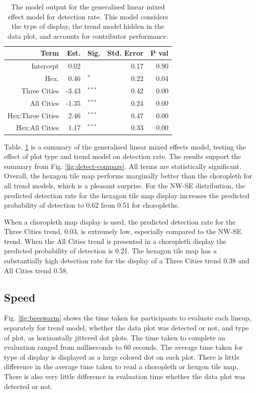 \documentclass[conference,final,]{IEEEtran}
\begin{document}
\begin{table}

\caption{\label{tab:detect-glmer1}The model output for the generalised linear mixed effect model for detection rate. This model considers the type of display, the trend model hidden in the data plot, and accounts for contributor performance.}
\centering
\begin{tabular}[t]{rrlrr}
\toprule
Term & Est. & Sig. & Std. Error & P val\\
\midrule
Intercept & 0.02 & $^{ }$ & 0.17 & 0.90\\
Hex. & 0.46 & $^{*}$ & 0.22 & 0.04\\
\addlinespace
Three Cities & -3.43 & $^{***}$ & 0.42 & 0.00\\
All Cities & -1.35 & $^{***}$ & 0.24 & 0.00\\
\addlinespace
Hex:Three Cities & 2.46 & $^{***}$ & 0.47 & 0.00\\
Hex:All Cities & 1.17 & $^{***}$ & 0.33 & 0.00\\
\bottomrule
\end{tabular}
\end{table}

Table. \ref{tab:detect-glmer1} is a summary of the generalised linear mixed effects model, testing the effect of plot type and trend model on detection rate. The results support the summary from Fig. \ref{fig:detect-compare}. All terms are statistically significant. Overall, the hexagon tile map performs marginally better than the choropleth for all trend models, which is a pleasant surprise.
For the NW-SE distribution, the predicted detection rate for the hexagon tile map display increases the predicted probability of detection to 0.62 from 0.51 for choropleths.

When a choropleth map display is used, the predicted detection rate for the Three Cities trend, 0.03, is extremely low, especially compared to the NW-SE trend. When the All Cities trend is presented in a choropleth display the predicted probability of detection is 0.21. The hexagon tile map has a substantially high detection rate for the display of a Three Cities trend 0.38 and All Cities trend 0.58.

\hypertarget{speed}{%
\subsection{Speed}\label{speed}}

Fig. \ref{fig:beeswarm} shows the time taken for participants to evaluate each lineup, separately for trend model, whether the data plot was detected or not, and type of plot, as horizontally jittered dot plots. The time taken to complete an evaluation ranged from milliseconds to 60 seconds. The average time taken for type of display is displayed as a large colored dot on each plot. There is little difference in the average time taken to read a choropleth or hexgon tile map. There is also very little difference in evaluation time whether the data plot was detected or not.
\end{document}
